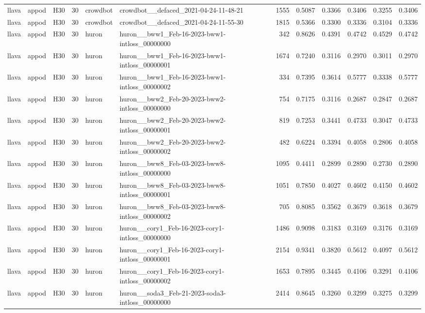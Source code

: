\begin{table}[tbp]
\begin{tabular}{lllrllrrrrrr}
llava & appod & H30 & 30 & crowdbot & crowdbot\_\_defaced\_2021-04-24-11-48-21 & 1555 & 0.5087 & 0.3366 & 0.3406 & 0.3255 & 0.3406 \\
llava & appod & H30 & 30 & crowdbot & crowdbot\_\_defaced\_2021-04-24-11-55-30 & 1815 & 0.5366 & 0.3300 & 0.3336 & 0.3104 & 0.3336 \\
llava & appod & H30 & 30 & huron & huron\_\_bww1\_Feb-16-2023-bww1-intloss\_00000000 & 342 & 0.8626 & 0.4391 & 0.4742 & 0.4529 & 0.4742 \\
llava & appod & H30 & 30 & huron & huron\_\_bww1\_Feb-16-2023-bww1-intloss\_00000001 & 1674 & 0.7240 & 0.3116 & 0.2970 & 0.3011 & 0.2970 \\
llava & appod & H30 & 30 & huron & huron\_\_bww1\_Feb-16-2023-bww1-intloss\_00000002 & 334 & 0.7395 & 0.3614 & 0.5777 & 0.3338 & 0.5777 \\
llava & appod & H30 & 30 & huron & huron\_\_bww2\_Feb-20-2023-bww2-intloss\_00000000 & 754 & 0.7175 & 0.3116 & 0.2687 & 0.2847 & 0.2687 \\
llava & appod & H30 & 30 & huron & huron\_\_bww2\_Feb-20-2023-bww2-intloss\_00000001 & 819 & 0.7253 & 0.3441 & 0.4733 & 0.3047 & 0.4733 \\
llava & appod & H30 & 30 & huron & huron\_\_bww2\_Feb-20-2023-bww2-intloss\_00000002 & 482 & 0.6224 & 0.3394 & 0.4058 & 0.2806 & 0.4058 \\
llava & appod & H30 & 30 & huron & huron\_\_bww8\_Feb-03-2023-bww8-intloss\_00000000 & 1095 & 0.4411 & 0.2899 & 0.2890 & 0.2730 & 0.2890 \\
llava & appod & H30 & 30 & huron & huron\_\_bww8\_Feb-03-2023-bww8-intloss\_00000001 & 1051 & 0.7850 & 0.4027 & 0.4602 & 0.4150 & 0.4602 \\
llava & appod & H30 & 30 & huron & huron\_\_bww8\_Feb-03-2023-bww8-intloss\_00000002 & 705 & 0.8085 & 0.3562 & 0.3679 & 0.3618 & 0.3679 \\
llava & appod & H30 & 30 & huron & huron\_\_cory1\_Feb-16-2023-cory1-intloss\_00000000 & 1486 & 0.9098 & 0.3183 & 0.3169 & 0.3176 & 0.3169 \\
llava & appod & H30 & 30 & huron & huron\_\_cory1\_Feb-16-2023-cory1-intloss\_00000001 & 2154 & 0.9341 & 0.3820 & 0.5612 & 0.4097 & 0.5612 \\
llava & appod & H30 & 30 & huron & huron\_\_cory1\_Feb-16-2023-cory1-intloss\_00000002 & 1653 & 0.7895 & 0.3445 & 0.4106 & 0.3291 & 0.4106 \\
llava & appod & H30 & 30 & huron & huron\_\_soda3\_Feb-21-2023-soda3-intloss\_00000000 & 2414 & 0.8645 & 0.3260 & 0.3299 & 0.3275 & 0.3299 \\

\end{tabular}
\end{table}
